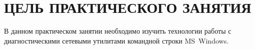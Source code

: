 \section{ЦЕЛЬ ПРАКТИЧЕСКОГО ЗАНЯТИЯ}

В данном практическом занятии необходимо изучить технологии работы с
диагностическими сетевыми утилитами командной строки MS~Windows.

\newpage
